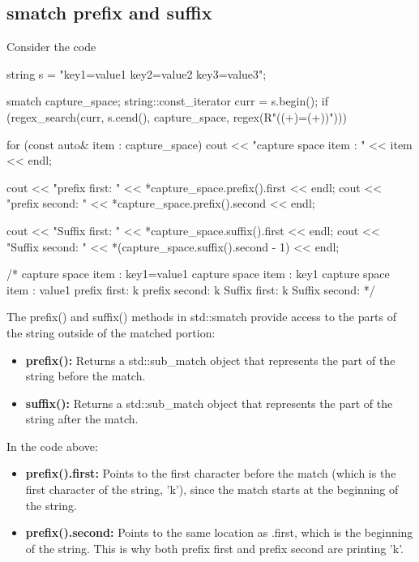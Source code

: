 \documentclass{report}
\begin{document}
    \subsection{smatch prefix and suffix}
    \bigbreak \noindent 
    Consider the code
    \bigbreak \noindent 
    \begin{cppcode}
        string s = "key1=value1 key2=value2 key3=value3";

        smatch capture_space;
        string::const_iterator curr = s.begin();
        if (regex_search(curr, s.cend(), capture_space, regex(R"(\s*(\w+)=(\w+)\s*)"))) {
            for (const auto& item : capture_space) {
                cout << "capture space item : " << item << endl;
            }

            cout << "prefix first: " << *capture_space.prefix().first << endl;
            cout << "prefix second: " << *capture_space.prefix().second << endl;

            cout << "Suffix first: " << *capture_space.suffix().first << endl;
            cout << "Suffix second: " << *(capture_space.suffix().second - 1) << endl;

            /*
                capture space item : key1=value1 
                capture space item : key1
                capture space item : value1
                prefix first: k
                prefix second: k
                Suffix first: k
                Suffix second:
            */
        }
    \end{cppcode}
    \bigbreak \noindent 
    The prefix() and suffix() methods in std::smatch provide access to the parts of the string outside of the matched portion:
    \bigbreak \noindent 
    \begin{itemize}
        \item \textbf{prefix():} Returns a std::sub\_match object that represents the part of the string before the match.
        \item \textbf{suffix():} Returns a std::sub\_match object that represents the part of the string after the match.
    \end{itemize}
    \bigbreak \noindent 
    In the code above:
    \begin{itemize}
        \item \textbf{prefix().first:} Points to the first character before the match (which is the first character of the string, 'k'), since the match starts at the beginning of the string.
        \item \textbf{prefix().second:} Points to the same location as .first, which is the beginning of the string. This is why both prefix first and prefix second are printing 'k'.
    \end{itemize}
\end{document}
